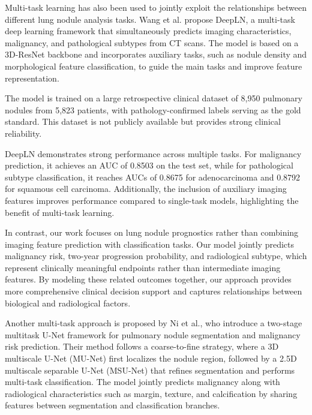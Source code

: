 \vspace{0.5cm}

Multi-task learning has also been used to jointly exploit the relationships between different lung nodule analysis tasks. Wang et al.\cite{wang2022} propose DeepLN, a multi-task deep learning framework that simultaneously predicts imaging characteristics, malignancy, and pathological subtypes from CT scans. The model is based on a 3D-ResNet backbone and incorporates auxiliary tasks, such as nodule density and morphological feature classification, to guide the main tasks and improve feature representation.

The model is trained on a large retrospective clinical dataset of 8,950 pulmonary nodules from 5,823 patients, with pathology-confirmed labels serving as the gold standard. This dataset is not publicly available but provides strong clinical reliability.

DeepLN demonstrates strong performance across multiple tasks. For malignancy prediction, it achieves an AUC of 0.8503 on the test set, while for pathological subtype classification, it reaches AUCs of 0.8675 for adenocarcinoma and 0.8792 for squamous cell carcinoma. Additionally, the inclusion of auxiliary imaging features improves performance compared to single-task models, highlighting the benefit of multi-task learning.

In contrast, our work focuses on lung nodule prognostics rather than combining imaging feature prediction with classification tasks. Our model jointly predicts malignancy risk, two-year progression probability, and radiological subtype, which represent clinically meaningful endpoints rather than intermediate imaging features. By modeling these related outcomes together, our approach provides more comprehensive clinical decision support and captures relationships between biological and radiological factors.

\vspace{0.5cm}

Another multi-task approach is proposed by Ni et al.\cite{ni2021}, who introduce a two-stage multitask U-Net framework for pulmonary nodule segmentation and malignancy risk prediction. Their method follows a coarse-to-fine strategy, where a 3D multiscale U-Net (MU-Net) first localizes the nodule region, followed by a 2.5D multiscale separable U-Net (MSU-Net) that refines segmentation and performs multi-task classification. The model jointly predicts malignancy along with radiological characteristics such as margin, texture, and calcification by sharing features between segmentation and classification branches.

